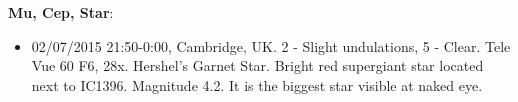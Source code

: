 {\bf Mu, Cep, Star}:
\begin{itemize}
\item 02/07/2015 21:50-0:00, Cambridge, UK. 2 - Slight undulations, 5 - Clear. Tele Vue 60 F6, 28x. Hershel's Garnet Star. Bright red supergiant star located next to IC1396. Magnitude 4.2. It is the biggest star visible at naked eye.
\end{itemize}
